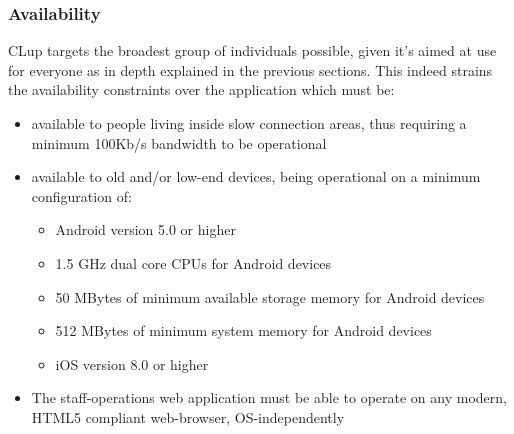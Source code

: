 \subsubsection{Availability}
CLup targets the broadest group of individuals possible, given it's aimed at use for everyone as in depth explained in the previous sections. This indeed strains the availability constraints over the application which must be:\newline
\begin{itemize}
    \item available to people living inside slow connection areas, thus requiring a minimum 100Kb/s bandwidth to be operational
    \item available to old and/or low-end devices, being operational on a minimum configuration of:
    \begin{itemize}
        \item Android version 5.0 or higher
        \item 1.5 GHz dual core CPUs for Android devices
        \item 50 MBytes of minimum available storage memory for Android devices
        \item 512 MBytes of minimum system memory for Android devices
        \item iOS version 8.0 or higher
    \end{itemize}
    \item The staff-operations web application must be able to operate on any modern, HTML5 compliant web-browser, OS-independently 
\end{itemize}
{\color{gray}
}


